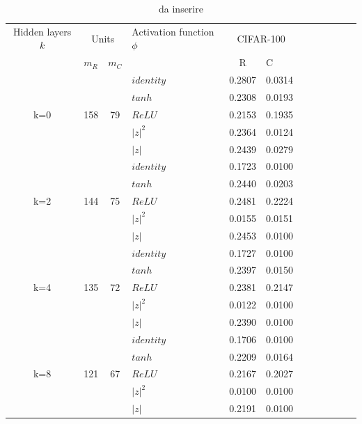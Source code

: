 \documentclass[a4paper,10pt]{article}
\begin{document}
 \begin{table}
  \centering
  \begin{tabular}{cp{} cp{} cp{}   cp{} cp{} cp{}}
   \cline{1-6}
   Hidden layers $k$ & \multicolumn{2}{c}{Units} $p_R$ & Activation function $\phi$ & \multicolumn{2}{c}{CIFAR-100}\\
   \cline{2-3} \cline{5-6}
   & $m_R$ & $m_C$ & & R & C \\
   \cline{1-6}
   & & & $identity$ & 0.2807 & 0.0314 \\
   \cline{4-6}
   & & & $tanh$ & 0.2308 & 0.0193 \\
   \cline{4-6}
   k=0 & 158 & 79 & $ReLU$ & 0.2153 & 0.1935 \\
   \cline{4-6}
   & & & $|z|^2$ & 0.2364 & 0.0124 \\
   \cline{4-6}
   & & & $|z|$ & 0.2439 & 0.0279 \\
   \cline{1-6}
   
   \cline{1-6}
   & & & $identity$ & 0.1723 & 0.0100 \\
   \cline{4-6}
   & & & $tanh$ & 0.2440 & 0.0203 \\
   \cline{4-6}
   k=2 & 144 & 75 & $ReLU$ & 0.2481 & 0.2224 \\
   \cline{4-6}
   & & & $|z|^2$ & 0.0155 & 0.0151 \\
   \cline{4-6}
   & & & $|z|$ & 0.2453 & 0.0100 \\
   \cline{1-6}
   
   \cline{1-6}
   & & & $identity$ & 0.1727 & 0.0100 \\
   \cline{4-6}
   & & & $tanh$ & 0.2397 & 0.0150 \\
   \cline{4-6}
   k=4 & 135 & 72 & $ReLU$ & 0.2381 & 0.2147 \\
   \cline{4-6}
   & & & $|z|^2$ & 0.0122 & 0.0100 \\
   \cline{4-6}
   & & & $|z|$ & 0.2390 & 0.0100 \\
   \cline{1-6}
   
   \cline{1-6}
   & & & $identity$ & 0.1706 & 0.0100 \\
   \cline{4-6}
   & & & $tanh$ & 0.2209 & 0.0164 \\
   \cline{4-6}
   k=8 & 121 & 67 & $ReLU$ & 0.2167 & 0.2027 \\
   \cline{4-6}
   & & & $|z|^2$ & 0.0100 & 0.0100 \\
   \cline{4-6}
   & & & $|z|$ & 0.2191 & 0.0100 \\
   \cline{1-6}
      
  \end{tabular}
  \caption{da inserire}
  \label{CIFAR-1002Tab}
 \end{table}
 
\end{document}
